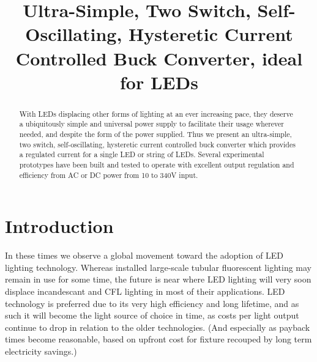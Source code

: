 \documentclass[conference]{IEEEtran}
\begin{document}
\title{Ultra-Simple, Two Switch, Self-Oscillating, Hysteretic Current Controlled Buck Converter, ideal for LEDs}

\author{%
}
\maketitle


\begin{abstract}
With LEDs displacing other forms of lighting at an ever increasing pace, they deserve a ubiquitously simple and universal power supply to facilitate their usage wherever needed, and despite the form of the power supplied. Thus we present an ultra-simple, two switch, self-oscillating, hysteretic current controlled buck converter which provides a regulated current for a single LED or string of LEDs. Several experimental prototypes have been built and tested to operate with excellent output regulation and efficiency from AC or DC power from 10 to 340V input. 
\end{abstract}

%
\IEEEpeerreviewmaketitle

\section{Introduction}

In these times we observe a global movement toward the adoption of LED lighting technology. Whereas installed large-scale tubular fluorescent lighting may remain in use for some time, the future is near where LED lighting will very soon displace incandescant and CFL lighting in most of their applications. LED technology is preferred due to its very high efficiency and long lifetime, and as such it will become the light source of choice in time, as costs per light output continue to drop in relation to the older technologies. (And especially as payback times become reasonable, based on upfront cost for fixture recouped by long term electricity savings.)
\end{document}
